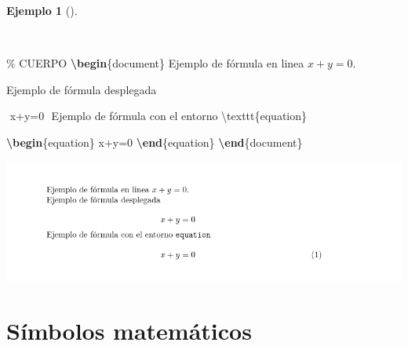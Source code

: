 \documentclass[
  a4paper,
]{scrreport}
\newenvironment{Shaded}{\begin{snugshade}}{\end{snugshade}}
\newcommand{\CommentTok}[1]{\textcolor[rgb]{0.37,0.37,0.37}{#1}}
\newcommand{\ExtensionTok}[1]{\textcolor[rgb]{0.00,0.23,0.31}{#1}}
\newcommand{\FunctionTok}[1]{\textcolor[rgb]{0.28,0.35,0.67}{#1}}
\newcommand{\KeywordTok}[1]{\textcolor[rgb]{0.00,0.23,0.31}{\textbf{#1}}}
\newcommand{\NormalTok}[1]{\textcolor[rgb]{0.00,0.23,0.31}{#1}}
\newcommand{\SpecialStringTok}[1]{\textcolor[rgb]{0.13,0.47,0.30}{#1}}
\theoremstyle{definition}
\newtheorem{example}{Ejemplo}[chapter]
\theoremstyle{remark}
\begin{document}
\begin{example}[]\protect\hypertarget{exm-entornos-matematicos}{}\label{exm-entornos-matematicos}

~

\begin{Shaded}
\begin{Highlighting}[]
\CommentTok{\% CUERPO}
\KeywordTok{\textbackslash{}begin}\NormalTok{\{}\ExtensionTok{document}\NormalTok{\}}
\NormalTok{Ejemplo de fórmula en linea }\SpecialStringTok{$ x+y=0 $}\NormalTok{.}

\NormalTok{Ejemplo de fórmula desplegada}

\SpecialStringTok{$$ }
\SpecialStringTok{x+y=0}
\SpecialStringTok{$$}
\NormalTok{Ejemplo de fórmula con el entorno }\FunctionTok{\textbackslash{}texttt}\NormalTok{\{equation\}}

\KeywordTok{\textbackslash{}begin}\NormalTok{\{}\ExtensionTok{equation}\NormalTok{\}}
\SpecialStringTok{x+y=0}
\KeywordTok{\textbackslash{}end}\NormalTok{\{}\ExtensionTok{equation}\NormalTok{\}}
\KeywordTok{\textbackslash{}end}\NormalTok{\{}\ExtensionTok{document}\NormalTok{\}}
\end{Highlighting}
\end{Shaded}

\begin{tcolorbox}[enhanced jigsaw, colframe=quarto-callout-note-color-frame, opacityback=0, title={Salida}, bottomrule=.15mm, left=2mm, coltitle=black, arc=.35mm, leftrule=.75mm, colback=white, rightrule=.15mm, colbacktitle=quarto-callout-note-color!10!white, toprule=.15mm, breakable, opacitybacktitle=0.6, bottomtitle=1mm, toptitle=1mm, titlerule=0mm]

\includegraphics{img/formulas/entornos-matematicos.png}

\end{tcolorbox}

\end{example}

\section{Símbolos matemáticos}\label{suxedmbolos-matemuxe1ticos}
\end{document}
